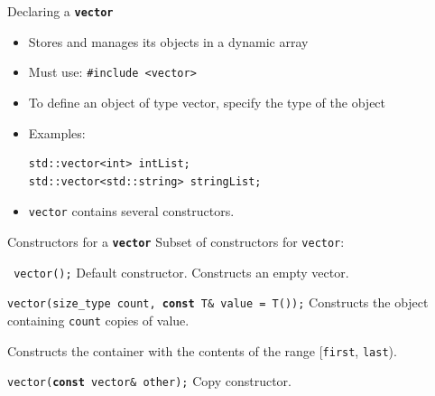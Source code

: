 \documentclass[14pt,aspectratio=1610]{beamer}
\begin{document}
\begin{frame}[fragile]{Declaring a \texttt{\bfseries vector}}
\begin{itemize}
\item
  Stores and manages its objects in a dynamic array
\item
  Must use: \lstinline{#include <vector>}
\item
  To define an object of type vector, specify the type of the object
\item
  Examples:
  \begin{lstlisting}
std::vector<int> intList;
std::vector<std::string> stringList;
\end{lstlisting}
\item
  \lstinline{vector} contains several constructors.
\end{itemize}
\end{frame}

\begin{frame}{Constructors for a \texttt{\bfseries vector}}
Subset of constructors for \lstinline{vector}:
\begin{description}[~~~~]\setlength\itemsep{0.25em}
\item[\colorbox{codeBackground}{\texttt{{\color{codeVariable} vector}();}}]\hfill\break%
  Default constructor. Constructs an empty vector.
\item[\colorbox{codeBackground}{\texttt{{\color{codeVariable}vector}({\color{codeVariable}size\_type count}, {\bfseries\color{codeKeyword}const} {\color{codeVariable}T}\& {\color{codeVariable}value} = {\color{codeVariable}T}());}}]\hfill\break%
  Constructs the object containing \lstinline{count} copies of value.
\item[{\parbox[t]{\linewidth}{\colorbox{codeBackground}{\texttt{{\bfseries\color{codeKeyword}template}<{\bfseries\color{codeKeyword}typename} {\color{codeVariable}InputIt}>}}\\\colorbox{codeBackground}{\texttt{{\color{codeVariable}vector}({\color{codeVariable}InputIt first}, {\color{codeVariable}InputIt last});}}}}]\hfill\break%
  Constructs the container with the contents of the range [\texttt{first}, \texttt{last}).
\item[\colorbox{codeBackground}{\texttt{{\color{codeVariable}vector}({\bfseries\color{codeKeyword}const} {\color{codeVariable}vector}\& {\color{codeVariable}other});}}]\hfill\break%
  Copy constructor.
\end{description}
\end{frame}
\end{document}

